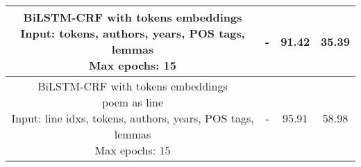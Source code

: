 \begin{table}[htpb]
\begin{tabular}{|c||c|c|c|}
    \makecell{BiLSTM-CRF with tokens embeddings\\Input: tokens, authors, years, POS tags, lemmas\\Max epochs: 15} & - & 91.42 & 35.39\\\hline
    \makecell{BiLSTM-CRF with tokens embeddings\\poem as line\\Input: line idxs, tokens, authors, years, POS tags,\\lemmas\\Max epochs: 15} & - & 95.91 & 58.98\\\hline
\end{tabular}
\end{table}